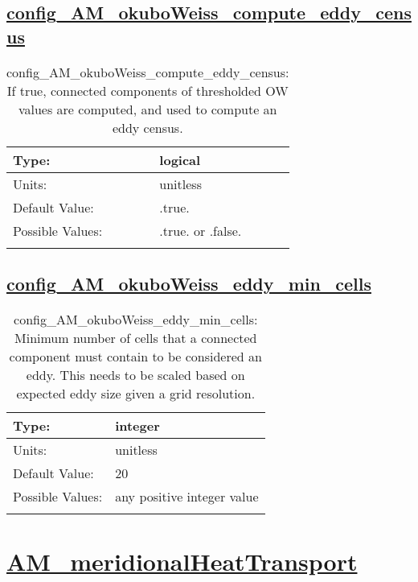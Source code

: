 \subsection[config\_AM\_okuboWeiss\_compute\_eddy\_census]{\hyperref[sec:nm_tab_AM_okuboWeiss]{config\_AM\_okuboWeiss\_compute\_eddy\_census}}
\label{subsec:nm_sec_config_AM_okuboWeiss_compute_eddy_census}
\begin{center}
\begin{longtable}{| p{2.0in} || p{4.0in} |}
    \hline
    Type: & logical \\
    \hline
    Units: & \si{unitless} \\
    \hline
    Default Value: & .true. \\
    \hline
    Possible Values: & .true. or .false. \\
    \hline
    \caption{config\_AM\_okuboWeiss\_compute\_eddy\_census: If true, connected components of thresholded OW values are computed, and used to compute an eddy census.}
\end{longtable}
\end{center}
\subsection[config\_AM\_okuboWeiss\_eddy\_min\_cells]{\hyperref[sec:nm_tab_AM_okuboWeiss]{config\_AM\_okuboWeiss\_eddy\_min\_cells}}
\label{subsec:nm_sec_config_AM_okuboWeiss_eddy_min_cells}
\begin{center}
\begin{longtable}{| p{2.0in} || p{4.0in} |}
    \hline
    Type: & integer \\
    \hline
    Units: & \si{unitless} \\
    \hline
    Default Value: & 20 \\
    \hline
    Possible Values: & any positive integer value \\
    \hline
    \caption{config\_AM\_okuboWeiss\_eddy\_min\_cells: Minimum number of cells that a connected component must contain to be considered an eddy. This needs to be scaled based on expected eddy size given a grid resolution.}
\end{longtable}
\end{center}
\section[AM\_meridionalHeatTransport]{\hyperref[sec:nm_tab_AM_meridionalHeatTransport]{AM\_meridionalHeatTransport}}
\label{sec:nm_sec_AM_meridionalHeatTransport}
